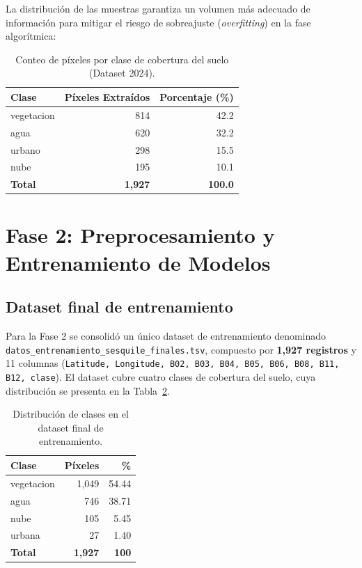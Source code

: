 \documentclass[12pt, letterpaper]{article}
\begin{document}
La distribuci\'on de las muestras garantiza un volumen m\'as adecuado de informaci\'on para mitigar el riesgo de sobreajuste (\textit{overfitting}) en la fase algor\'itmica:

\begin{table}[H]
  \centering
  \caption{Conteo de p\'ixeles por clase de cobertura del suelo (Dataset 2024).}
  \label{tab:clases}
  \begin{tabular}{lrr}
    \toprule
    \textbf{Clase} & \textbf{P\'ixeles Extra\'idos} & \textbf{Porcentaje (\%)} \\
    \midrule
    vegetacion & 814  & 42.2 \\
    agua       & 620  & 32.2 \\
    urbano     & 298  & 15.5 \\
    nube       & 195  & 10.1 \\
    \midrule
    \textbf{Total} & \textbf{1{,}927} & \textbf{100.0} \\
    \bottomrule
  \end{tabular}
\end{table}
\section{Fase 2: Preprocesamiento y Entrenamiento de Modelos}

\subsection*{Dataset final de entrenamiento}

Para la Fase 2 se consolid\'o un \'unico dataset de entrenamiento denominado
\texttt{datos\_entre\allowbreak namiento\_ses\allowbreak quile\_finales.tsv}, compuesto por \textbf{1{,}927 registros}
y 11 columnas (\texttt{Latitude, Longitude, B02, B03, B04, B05, B06, B08, B11, B12, clase}).
El dataset cubre cuatro clases de cobertura del suelo, cuya distribuci\'on se presenta en la
Tabla~\ref{tab:dataset_final}.

\begin{table}[H]
  \centering
  \caption{Distribuci\'on de clases en el dataset final de entrenamiento.}
  \label{tab:dataset_final}
  \begin{tabular}{lrr}
    \toprule
    \textbf{Clase} & \textbf{P\'ixeles} & \textbf{\%} \\
    \midrule
    vegetacion & 1{,}049 & 54.44 \\
    agua       &   746   & 38.71 \\
    nube       &   105   &  5.45 \\
    urbana     &    27   &  1.40 \\
    \midrule
    \textbf{Total} & \textbf{1{,}927} & \textbf{100} \\
    \bottomrule
  \end{tabular}
\end{table}
\end{document}
